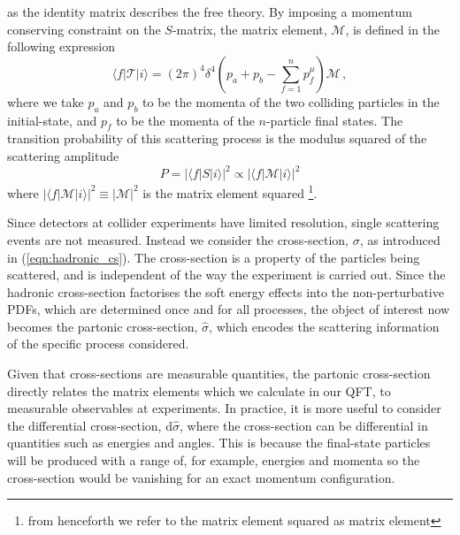 \documentclass[main.tex]{subfiles}
\begin{document}
    as the identity matrix describes the free theory.
    By imposing a momentum conserving constraint
    on the $S$-matrix, the matrix element,
    $\mathcal{M}$, is defined in the following expression
    \begin{equation}\label{eqn:matrix_element}
        \langle f | \mathcal{T} | i \rangle = (2\pi)^{4} \delta^{4}\left(p_{a} + p_{b} - \sum_{f=1}^{n} p_{f}^{\mu}\right) \mathcal{M} \, ,
    \end{equation}
    where we take $p_{a}$ and $p_{b}$ to be
    the momenta of the two colliding
    particles in the initial-state, and $p_{f}$ to be the
    momenta of the $n$-particle final states.
    The transition probability of this scattering process
    is the modulus squared of the scattering amplitude
    \begin{equation}\label{eqn:S_prob}
        P = |\langle f | S | i \rangle|^{2} \propto | \langle f | \mathcal{M} | i \rangle |^{2}
    \end{equation}
    where $|\langle f | \mathcal{M} | i \rangle|^{2}  \equiv |\mathcal{M}|^{2}$
    is the matrix element squared \footnote{from henceforth we refer to the matrix
    element squared as matrix element}.
    
    Since detectors at collider experiments
    have limited resolution, single scattering
    events are not measured. Instead we consider
    the cross-section, $\sigma$, as introduced in
    (\ref{eqn:hadronic_cs}). The cross-section is a property
    of the particles being scattered, and is independent
    of the way the experiment is carried out.
    Since the hadronic cross-section factorises
    the soft energy effects into the non-perturbative PDFs,
    which are determined once and for all
    processes, the object of interest now becomes the
    partonic cross-section, $\hat{\sigma}$, which
    encodes the scattering information of the specific
    process considered.

    Given that cross-sections are measurable
    quantities, the partonic cross-section directly
    relates the matrix elements which we calculate in our QFT,
    to measurable observables at experiments.
    In practice, it is more useful to consider the
    differential cross-section, $\mathrm{d}\hat{\sigma}$,
    where the cross-section can be differential
    in quantities such as energies and angles.
    This is because the final-state particles
    will be produced with a range of, for example,
    energies and momenta so the cross-section would
    be vanishing for an exact momentum configuration.
\end{document}
